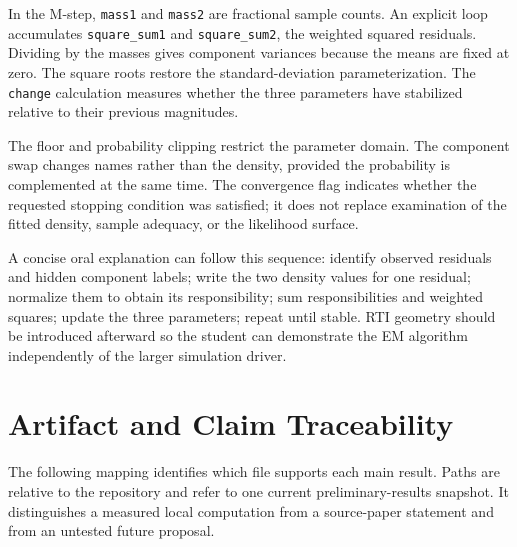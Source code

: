 \documentclass[conference,letterpaper]{IEEEtran}
\begin{document}
In the M-step, \texttt{mass1} and \texttt{mass2} are fractional sample counts. An explicit loop accumulates \texttt{square\_sum1} and \texttt{square\_sum2}, the weighted squared residuals. Dividing by the masses gives component variances because the means are fixed at zero. The square roots restore the standard-deviation parameterization. The \texttt{change} calculation measures whether the three parameters have stabilized relative to their previous magnitudes.

The floor and probability clipping restrict the parameter domain. The component swap changes names rather than the density, provided the probability is complemented at the same time. The convergence flag indicates whether the requested stopping condition was satisfied; it does not replace examination of the fitted density, sample adequacy, or the likelihood surface.

A concise oral explanation can follow this sequence: identify observed residuals and hidden component labels; write the two density values for one residual; normalize them to obtain its responsibility; sum responsibilities and weighted squares; update the three parameters; repeat until stable. RTI geometry should be introduced afterward so the student can demonstrate the EM algorithm independently of the larger simulation driver.

\section{Artifact and Claim Traceability}
The following mapping identifies which file supports each main result. Paths are relative to the repository and refer to one current preliminary-results snapshot. It distinguishes a measured local computation from a source-paper statement and from an untested future proposal.
\end{document}
